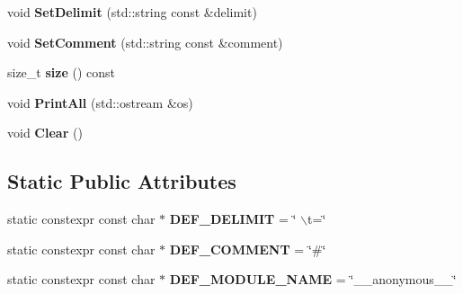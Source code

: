 \begin{DoxyCompactItemize}
\item 
\hypertarget{classlsf_1_1util_1_1Config_a575ab5c80d4d97763dff92a1891084b9}{
void {\bfseries SetDelimit} (std::string const \&delimit)}
\label{classlsf_1_1util_1_1Config_a575ab5c80d4d97763dff92a1891084b9}

\item 
\hypertarget{classlsf_1_1util_1_1Config_a42c1f59491727ff3b90a51fc6d9d7bd7}{
void {\bfseries SetComment} (std::string const \&comment)}
\label{classlsf_1_1util_1_1Config_a42c1f59491727ff3b90a51fc6d9d7bd7}

\item 
\hypertarget{classlsf_1_1util_1_1Config_a713ece49ead0a4944e4a8e17b03c98e1}{
size\_\-t {\bfseries size} () const }
\label{classlsf_1_1util_1_1Config_a713ece49ead0a4944e4a8e17b03c98e1}

\item 
\hypertarget{classlsf_1_1util_1_1Config_af625a066132bf3ebfceff4768fefa27e}{
void {\bfseries PrintAll} (std::ostream \&os)}
\label{classlsf_1_1util_1_1Config_af625a066132bf3ebfceff4768fefa27e}

\item 
\hypertarget{classlsf_1_1util_1_1Config_a37dadb96a7cc99976f624f1eccd5db0b}{
void {\bfseries Clear} ()}
\label{classlsf_1_1util_1_1Config_a37dadb96a7cc99976f624f1eccd5db0b}

\end{DoxyCompactItemize}
\subsection*{Static Public Attributes}
\begin{DoxyCompactItemize}
\item 
\hypertarget{classlsf_1_1util_1_1Config_ac29cb03e0b73941cefb853897c0e554c}{
static constexpr const char $\ast$ {\bfseries DEF\_\-DELIMIT} = \char`\"{} $\backslash$t=\char`\"{}}
\label{classlsf_1_1util_1_1Config_ac29cb03e0b73941cefb853897c0e554c}

\item 
\hypertarget{classlsf_1_1util_1_1Config_a47833d58306e0614ae53ba3dabd39c2c}{
static constexpr const char $\ast$ {\bfseries DEF\_\-COMMENT} = \char`\"{}\#\char`\"{}}
\label{classlsf_1_1util_1_1Config_a47833d58306e0614ae53ba3dabd39c2c}

\item 
\hypertarget{classlsf_1_1util_1_1Config_a84c0781492615113d5a029b9ff758bc4}{
static constexpr const char $\ast$ {\bfseries DEF\_\-MODULE\_\-NAME} = \char`\"{}\_\-\_\-anonymous\_\-\_\-\char`\"{}}
\label{classlsf_1_1util_1_1Config_a84c0781492615113d5a029b9ff758bc4}

\end{DoxyCompactItemize}

